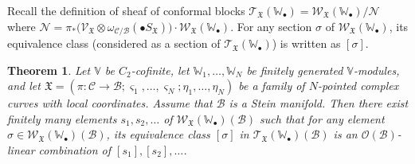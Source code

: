 \documentclass[12pt,b5paper,notitlepage]{report}
\theoremstyle{definition}
\theoremstyle{plain}
\newtheorem{thm}[df]{Theorem}
\newcommand{\fk}{\mathfrak}
\newcommand{\mc}{\mathcal}
\newcommand{\scr}{\mathscr}
\newcommand{\sgm}{\varsigma}
\newcommand{\blt}{\bullet}
\newcommand{\Vbb}{\mathbb V}
\newcommand{\Wbb}{\mathbb W}
\numberwithin{equation}{section}
\begin{document}
Recall the definition of sheaf of conformal blocks $\scr T_{\fk X}(\Wbb_\blt)=\scr W_{\fk X}(\Wbb_\blt)/\scr N$ where $\scr N=\pi_*\big(\scr V_{\fk X}\otimes\omega_{\mc C/\mc B}(\blt S_{\fk X})\big)\cdot \scr W_{\fk X}(\Wbb_\blt)$. For any section $\sigma$ of $\scr W_{\fk X}(\Wbb_\blt)$, its equivalence class (considered as a section of $\scr T_{\fk X}(\Wbb_\blt)$) is written as $[\sigma]$.

\begin{thm}\label{lb67}
Let $\Vbb$ be $C_2$-cofinite, let $\Wbb_1,\dots,\Wbb_N$ be finitely generated $\Vbb$-modules, and let $\fk X=(\pi:\mc C\rightarrow\mc B;\sgm_1,\dots,\sgm_N;\eta_1,\dots,\eta_N)$ be a family of $N$-pointed complex curves with local coordinates. Assume that $\mc B$ is a  Stein manifold. Then there exist finitely many elements $s_1,s_2,\dots$ of $\scr W_{\fk X}(\Wbb_\blt)(\mc B)$ such that  for any element $\sigma\in\scr W_{\fk X}(\Wbb_\blt)(\mc B)$, its equivalence class $[\sigma]$ in $\scr T_{\fk X}(\Wbb_\blt)(\mc B)$ is an $\scr O(\mc B)$-linear combination of $[s_1],[s_2],\dots$.
\end{thm}
\end{document}
